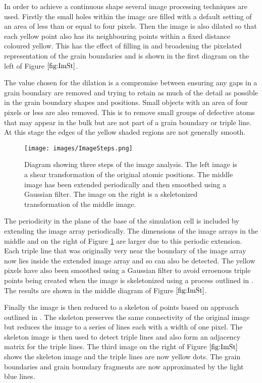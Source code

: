 \documentclass[12pt,a4paper,openany]{report}
\begin{document}
In order to achieve a continuous shape several image processing techniques are used. Firstly the small holes within the image are filled with a default setting of an area of less than or equal to four pixels. Then the image is also dilated so that each yellow point also has its neighbouring points within a fixed distance coloured yellow. This has the effect of filling in and broadening the pixelated representation of the grain boundaries and is shown in the first diagram on the left of Figure $\ref{fig:ImSt}$. 

The value chosen for the dilation is a compromise between ensuring any gaps in a grain boundary are removed and trying to retain as much of the detail as possible in the grain boundary shapes and positions. Small objects with an area of four pixels or less are also removed. This is to remove small groups of defective atoms that may appear in the bulk but are not part of a grain boundary or triple line. At this stage the edges of the yellow shaded regions are not generally smooth.

 
\begin{figure}[H]
	\centering
	\texttt{[image: images/ImageSteps.png]} 
	\caption{Diagram showing three steps of the image analysis. The left image is a shear transformation of the original atomic positions. The middle image has been extended periodically and then smoothed using a Gaussian filter. The image on the right is a skeletonized transformation of the middle image.}  
	\label{fig:ImSt}
\end{figure}


The periodicity in the plane of the base of the simulation cell is included by extending the image array periodically. The dimensions of the image arrays in the middle and on the right of Figure \ref{fig:ImSt} are larger due to this periodic extension. Each triple line that was originally very near the boundary of the image array now lies inside the extended image array and so can also be detected. The yellow pixels have also been smoothed using a Gaussian filter to avoid erroenous triple points being created when the image is skeletonized using a process outlined in \cite{ZHANG1997}. The results are shown in the middle diagram of Figure $\ref{fig:ImSt}$.  

Finally the image is then reduced to a skeleton of points based on approach outlined in \cite{Abu-Ain2013} . The skeleton preserves the same connectivity of the original image but reduces the image to a series of lines each with a width of one pixel. The skeleton image is then used to detect triple lines and also form an adjacency matrix for the triple lines. The third image on the right of Figure $\ref{fig:ImSt}$ shows the skeleton image and the triple lines are now yellow dots. The grain boundaries and grain boundary fragments are now approximated by the light blue lines.
\end{document}
